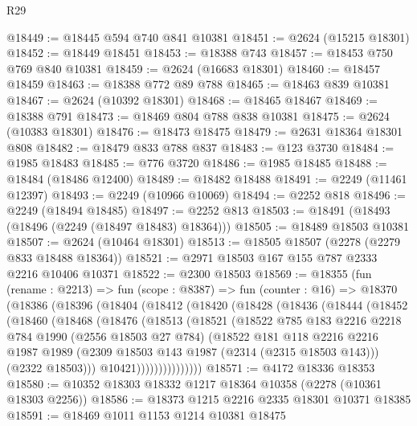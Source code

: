 \begin{lexlean}{R29}
\begin{coremodule}
@18449 := @18445 @594 @740 @841 @10381
@18451 := @2624 (@15215 @18301)
@18452 := @18449 @18451
@18453 := @18388 @743
@18457 := @18453 @750 @769 @840 @10381
@18459 := @2624 (@16683 @18301)
@18460 := @18457 @18459
@18463 := @18388 @772 @89 @788
@18465 := @18463 @839 @10381
@18467 := @2624 (@10392 @18301)
@18468 := @18465 @18467
@18469 := @18388 @791
@18473 := @18469 @804 @788 @838 @10381
@18475 := @2624 (@10383 @18301)
@18476 := @18473 @18475
@18479 := @2631 @18364 @18301 @808
@18482 := @18479 @833 @788 @837
@18483 := @123 @3730
@18484 := @1985 @18483
@18485 := @776 @3720
@18486 := @1985 @18485
@18488 := @18484 (@18486 @12400)
@18489 := @18482 @18488
@18491 := @2249 (@11461 @12397)
@18493 := @2249 (@10966 @10069)
@18494 := @2252 @818
@18496 := @2249 (@18494 @18485)
@18497 := @2252 @813
@18503 := @18491 (@18493 (@18496 (@2249 (@18497 @18483) @18364)))
@18505 := @18489 @18503 @10381
@18507 := @2624 (@10464 @18301)
@18513 := @18505 @18507 (@2278 (@2279 @833 @18488 @18364))
@18521 := @2971 @18503 @167 @155 @787 @2333 @2216 @10406 @10371
@18522 := @2300 @18503
@18569 := @18355
    (fun (rename : @2213) =>
    fun (scope : @8387) =>
    fun (counter : @16) =>
    @18370
      (@18386
        (@18396
          (@18404
            (@18412
              (@18420
                (@18428
                  (@18436
                    (@18444
                      (@18452
                        (@18460
                          (@18468
                            (@18476
                              (@18513
                                (@18521
                                  (@18522
                                    @785
                                    @183
                                    @2216
                                    @2218
                                    @784
                                    @1990
                                    (@2556 @18503 @27 @784)
                                    (@18522
                                      @181
                                      @118
                                      @2216
                                      @2216
                                      @1987
                                      @1989
                                      (@2309 @18503 @143 @1987 (@2314 (@2315 @18503 @143)))
                                      (@2322 @18503)))
                                  @10421)))))))))))))))
@18571 := @4172 @18336 @18353
@18580 := @10352 @18303 @18332 @1217 @18364 @10358 (@2278 (@10361 @18303 @2256))
@18586 := @18373 @1215 @2216 @2335 @18301 @10371 @18385
@18591 := @18469 @1011 @1153 @1214 @10381 @18475

\end{coremodule}
\end{lexlean}
